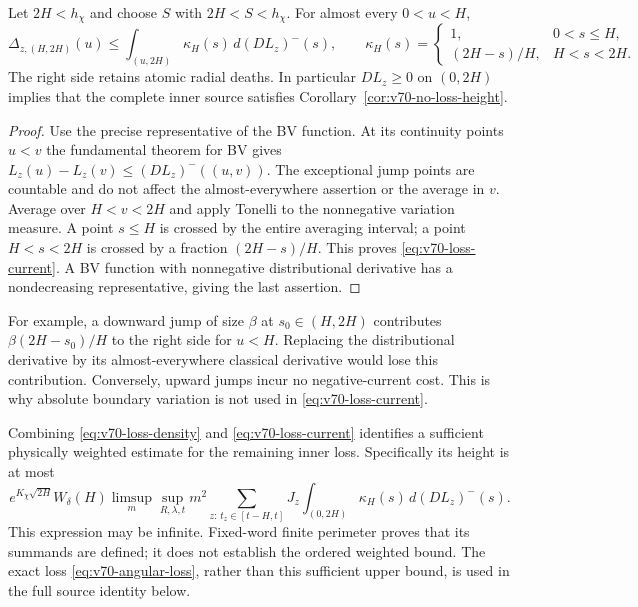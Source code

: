 \begin{proposition}
\label{prop:v70-loss-current}
Let $2H<h_\chi$ and choose $S$ with $2H<S<h_\chi$. For almost
every $0<u<H$,
\begin{equation}\label{eq:v70-loss-current}
 \Delta_{z,(H,2H)}(u)
 \le\int_{(u,2H)}\kappa_H(s)\,d(DL_z)^-(s),
 \qquad
 \kappa_H(s)=
 \begin{cases}
 1,&0<s\le H,\\
 (2H-s)/H,&H<s<2H.
 \end{cases}
\end{equation}
The right side retains atomic radial deaths. In particular
$DL_z\ge0$ on $(0,2H)$ implies that the complete inner source
satisfies Corollary~\ref{cor:v70-no-loss-height}.
\end{proposition}
\begin{proof}
Use the precise representative of the BV function. At its continuity
points $u<v$ the fundamental theorem for BV gives
$L_z(u)-L_z(v)\le (DL_z)^-((u,v))$. The exceptional jump points
are countable and do not affect the almost-everywhere assertion or
the average in $v$. Average over $H<v<2H$ and apply Tonelli to the
nonnegative variation measure. A point $s\le H$ is crossed by the
entire averaging interval; a point $H<s<2H$ is crossed by a fraction
$(2H-s)/H$. This proves \eqref{eq:v70-loss-current}. A BV function
with nonnegative distributional derivative has a nondecreasing
representative, giving the last assertion.
\end{proof}

For example, a downward jump of size $\beta$ at $s_0\in(H,2H)$
contributes $\beta(2H-s_0)/H$ to the right side for $u<H$.
Replacing the distributional derivative by its almost-everywhere
classical derivative would lose this contribution. Conversely, upward
jumps incur no negative-current cost. This is why absolute boundary
variation is not used in \eqref{eq:v70-loss-current}.

Combining \eqref{eq:v70-loss-density} and
\eqref{eq:v70-loss-current} identifies a sufficient physically
weighted estimate for the remaining inner loss. Specifically its
height is at most
\[
 e^{K_\chi\sqrt{2H}}W_\delta(H)
 \limsup_m\sup_{R,\lambda,t}m^2
 \sum_{z:\,t_z\in[t-H,t]}J_z
            \int_{(0,2H)}\kappa_H(s)\,d(DL_z)^-(s).
\]
This expression may be infinite. Fixed-word finite perimeter proves
that its summands are defined; it does not establish the ordered
weighted bound. The exact loss \eqref{eq:v70-angular-loss}, rather
than this sufficient upper bound, is used in the full source identity
below.
